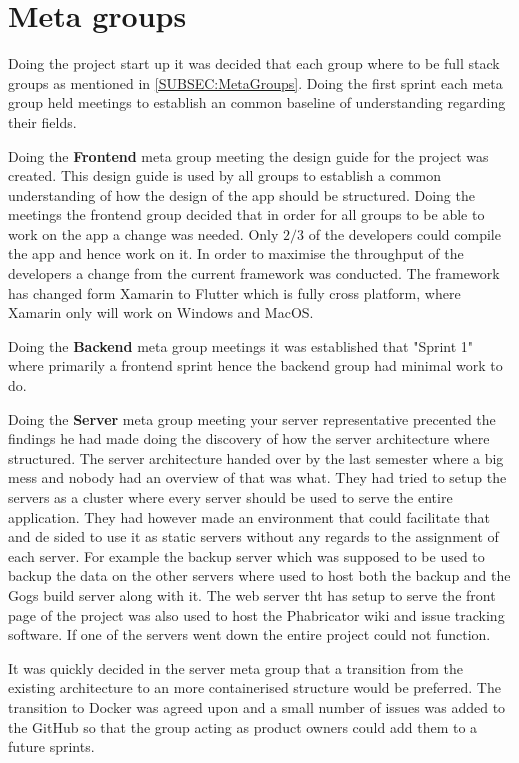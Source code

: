 \section{Meta groups}
Doing the project start up it was decided that each group where to be full stack groups as mentioned in \autoref{SUBSEC:MetaGroups}. 
Doing the first sprint each meta group held meetings to establish an common baseline of understanding regarding their fields. 

Doing the \textbf{Frontend} meta group meeting the design guide for the project was created. 
This design guide is used by all groups to establish a common understanding of how the design of the app should be structured. 
Doing the meetings the frontend group decided that in order for all groups to be able to work on the app a change was needed. 
Only $2/3$ of the developers could compile the app and hence work on it. 
In order to maximise the throughput of the developers a change from the current framework was conducted.
The framework has changed form Xamarin to Flutter which is fully cross platform, where Xamarin only will work on Windows and MacOS. 

Doing the \textbf{Backend} meta group meetings it was established that "Sprint 1" where primarily a frontend sprint hence the backend group had minimal work to do. 

Doing the \textbf{Server} meta group meeting your server representative precented the findings he had made doing the discovery of how the server architecture where structured. 
The server architecture handed over by the last semester where a big mess and nobody had an overview of that was what. 
They had tried to setup the servers as a cluster where every server should be used to serve the entire application. 
They had however made an environment that could facilitate that and de sided to use it as static servers without any regards to the assignment of each server. 
For example the backup server which was supposed to be used to backup the data on the other servers where used to host both the backup and the Gogs build server along with it. 
The web server tht has setup to serve the front page of the project was also used to host the Phabricator wiki and issue tracking software.
If one of the servers went down the entire project could not function. 

It was quickly decided in the server meta group that a transition from the existing architecture to an more containerised structure would be preferred. 
The transition to Docker was agreed upon and a small number of issues was added to the GitHub so that the group acting as product owners could add them to a future sprints. 
